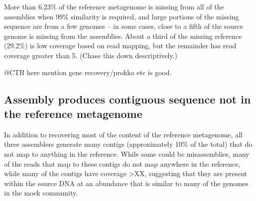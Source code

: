 \documentclass[10pt,a4paper,twocolumn]{article}
\begin{document}
 
More than 6.23\% of the reference metagenome is missing from all of
the assemblies when 99\% similarity is required, and large portions of
the missing sequence are from a few genomes -- in some cases, close to
a fifth of the source genome is missing from the assemblies.
About a third of the missing reference (29.2\%) is low coverage based on
read mapping, but the remainder has read coverage greater than 5.
(Chase this down descriptively.)




@CTB here mention gene recovery/prokka etc is good.


\subsection*{Assembly produces contiguous sequence not in the reference metagenome}

In addition to recovering most of the content of the reference
metagenome, all three assemblers generate many contigs (approximately
10\% of the total) that do not map to anything in the reference.
While some could be misassemblies, many of the reads that map to these
contigs do not map anywhere in the reference, while many of the
contigs have coverage >XX, suggesting that they are present within the
source DNA at an abundance that is similar to many of the genomes in
the mock community.
\end{document}
